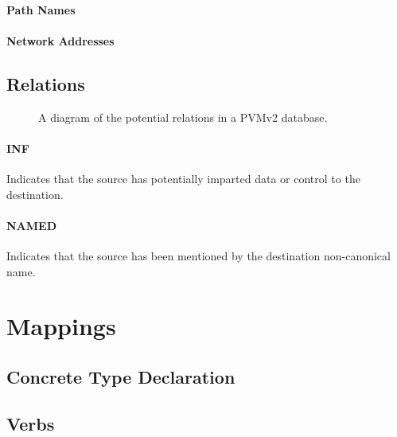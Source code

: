\documentclass[12pt,twoside,a4paper]{article}
\begin{document}
\paragraph{Path Names}

\paragraph{Network Addresses}

\subsection{Relations}

\begin{figure}[!h]
\centering
{}
\caption{A diagram of the potential relations in a PVMv2 database.}
\end{figure}

\paragraph{INF}
Indicates that the source has potentially imparted data or control to the destination.

\paragraph{NAMED}
Indicates that the source has been mentioned by the destination non-canonical name.

\section{Mappings}

\subsection{Concrete Type Declaration}

\subsection{Verbs}
\end{document}
